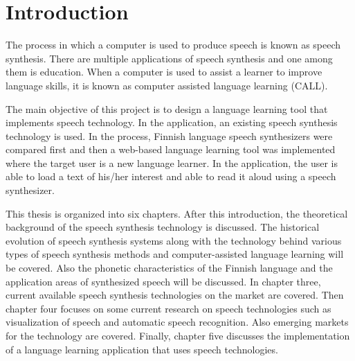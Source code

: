 \documentclass[11pt,a4paper,oneside,article]{memoir}
\begin{document}
\newpage

\pagestyle{plain}

\setcounter{page}{1} %
\ClearWallPaper

\chapter{Introduction}


The process in which a computer is used to produce speech is known as speech synthesis. There are multiple applications of speech synthesis and one among them is education. When a computer is used to assist a learner to improve language skills, it is known as computer assisted language learning (CALL). 
	
The main objective of this project is to design a language learning tool that implements speech technology. In the application, an existing speech synthesis technology is used. In the process, Finnish language speech synthesizers were compared first and then a web-based language learning tool was implemented where the target user is a new language learner. In the application, the user is able to load a text of his/her interest and able to read it aloud using a speech synthesizer.	

This thesis is organized into six chapters. After this introduction, the theoretical background of the speech synthesis technology is discussed. The historical evolution of speech synthesis systems along with the technology behind various types of speech synthesis methods and computer-assisted language learning will be covered. Also the phonetic characteristics of the Finnish language and the application areas of synthesized speech will be discussed. In chapter three, current available speech synthesis technologies on the market are covered. Then chapter four focuses on some current research on speech technologies such as visualization of speech and automatic speech recognition. Also emerging markets for the technology are covered. Finally, chapter five discusses the implementation of a language learning application that uses speech technologies.
\end{document}
